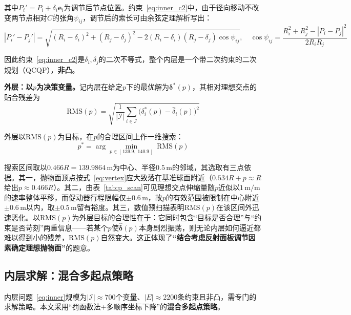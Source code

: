 \documentclass[withoutpreface]{cumcmthesis}
\begin{document}
其中$P_i'=P_i+\delta_i\mathbf{e}_i$为调节后节点位置。约束~\eqref{eq:inner_c2}中，由于径向移动不改变两节点相对$C$的张角$\psi_{ij}$，调节后的索长可由余弦定理解析写出：
\begin{equation}\label{eq:cosine}
|P_i'-P_j'|=\sqrt{(R_i-\delta_i)^{2}+(R_j-\delta_j)^{2}-2(R_i-\delta_i)(R_j-\delta_j)\cos\psi_{ij}},\quad
\cos\psi_{ij}=\frac{R_i^{2}+R_j^{2}-|P_i-P_j|^{2}}{2R_iR_j}
\end{equation}

因此约束~\eqref{eq:inner_c2}是$\delta_i,\delta_j$的二次不等式，整个内层是一个带二次约束的二次规划（QCQP），\textbf{非凸}。

\textbf{外层：以$p$为决策变量。}记内层在给定$p$下的最优解为$\boldsymbol{\delta}^{*}(p)$，其相对理想交点的贴合残差为
\begin{equation}\label{eq:rms}
\mathrm{RMS}(p)=\sqrt{\frac{1}{|\mathcal{I}|}\sum_{i\in\mathcal{I}}\bigl(\delta_i^{*}(p)-\hat{\delta}_i(p)\bigr)^{2}}
\end{equation}

外层以$\mathrm{RMS}(p)$为目标，在$p$的合理区间上作一维搜索：
\begin{equation}\label{eq:outer}
p^{*}=\arg\min_{p\in[\,139.9,\;140.9\,]}\ \mathrm{RMS}(p)
\end{equation}

搜索区间取以$0.466R=139.9864\,\mathrm{m}$为中心、半径$0.5\,\mathrm{m}$的邻域，其选取有三点依据。其一，抛物面顶点按式~\eqref{eq:vertex}应大致落在基准球面附近（$0.534R+p\approx R$给出$p\approx0.466R$）。其二，由表~\ref{tab:p_scan}可见理想交点伸缩量随$p$近似以$1\,\mathrm{m}/\mathrm{m}$的速率整体平移，而促动器行程限幅仅$\pm0.6\,\mathrm{m}$，故$p$的有效范围被限制在中心附近$\pm0.6\,\mathrm{m}$以内，取$\pm0.5\,\mathrm{m}$留有裕度。其三，数值预扫描表明$\mathrm{RMS}(p)$在该区间外迅速恶化。以$\mathrm{RMS}(p)$为外层目标的合理性在于：它同时包含``目标是否合理''与``约束是否苛刻''两重信息——若某个$p$使$\hat{\boldsymbol{\delta}}(p)$本身剧烈振荡，则无论内层如何逼近都难以得到小的残差，$\mathrm{RMS}(p)$自然变大。这正体现了\textbf{``结合考虑反射面板调节因素确定理想抛物面''}的题意。

\subsection{内层求解：混合多起点策略}

内层问题~\eqref{eq:inner}规模为$|\mathcal{I}|\approx700$个变量、$|E|\approx2200$条约束且非凸，需专门的求解策略。本文采用``罚函数法+多顺序坐标下降''的\textbf{混合多起点策略}。
\end{document}
